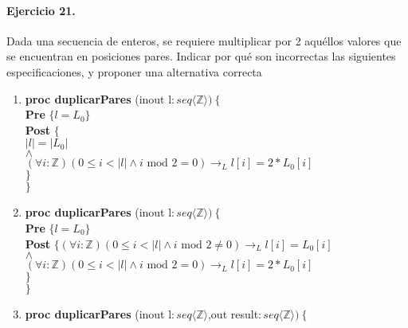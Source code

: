\documentclass[a4paper]{article}
\begin{document}
	
\paragraph*{Ejercicio 21.} Dada una secuencia de enteros, se requiere multiplicar por 2 aquéllos valores que se encuentran en posiciones pares. Indicar por qué son incorrectas las siguientes especificaciones, y proponer una alternativa correcta
	\begin{enumerate}[label=\alph*)]
		\item
			
			\textbf{proc duplicarPares }(inout l$: seq\langle \mathbb{Z}\rangle)\ \{$\smallskip \\
			\hspace*{6mm} \textbf{Pre }$\{ l=L_0\}$\smallskip \\
			\hspace*{6mm} \textbf{Post }$\{$\\
			\hspace*{6mm} $|l|=|L_0|$\\
			\hspace*{6mm} $\wedge$\\
			\hspace*{6mm} $(\forall i:\mathbb{Z})(0\leq i <|l|\wedge i \textrm{ mod }2=0)
							\rightarrow_L l[i]=2*L_0[i]$\\			
			\hspace*{6mm}$\}$\\
			$\}$
		\item
			\textbf{proc duplicarPares }(inout l$: seq\langle \mathbb{Z}\rangle)\ \{$\smallskip \\
			\hspace*{6mm} \textbf{Pre }$\{ l=L_0\}$\smallskip \\
			\hspace*{6mm} \textbf{Post }$\{(\forall i:\mathbb{Z})
					(0\leq i <|l|\wedge i \textrm{ mod }2\neq 0)
							\rightarrow_L l[i]=L_0[i]$\\
			\hspace*{6mm} $\wedge$\\
			\hspace*{6mm} $(\forall i:\mathbb{Z})(0\leq i <|l|\wedge i \textrm{ mod }2=0)
							\rightarrow_L l[i]=2*L_0[i]$\\				
			\hspace*{6mm}$\}$\\
			$\}$
		\item
			\textbf{proc duplicarPares }(inout l$: seq\langle \mathbb{Z}\rangle
				$,out result$:seq\langle \mathbb{Z}\rangle)\ \{$\smallskip \\

\end{enumerate}
\end{document}

